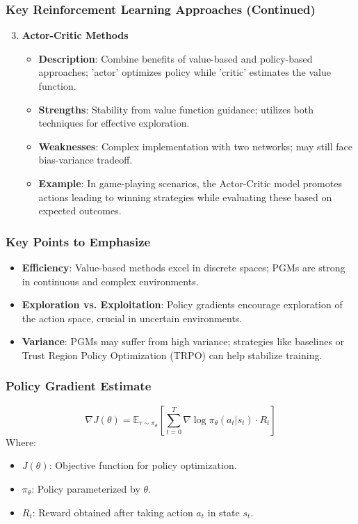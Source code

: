 \documentclass[aspectratio=169]{beamer}
\begin{document}
\begin{frame}[fragile]
    \frametitle{Key Reinforcement Learning Approaches (Continued)}
    \begin{enumerate}
        \setcounter{enumi}{2}
        \item \textbf{Actor-Critic Methods}
            \begin{itemize}
                \item \textbf{Description}: Combine benefits of value-based and policy-based approaches; 'actor' optimizes policy while 'critic' estimates the value function.
                \item \textbf{Strengths}: Stability from value function guidance; utilizes both techniques for effective exploration.
                \item \textbf{Weaknesses}: Complex implementation with two networks; may still face bias-variance tradeoff.
                \item \textbf{Example}: In game-playing scenarios, the Actor-Critic model promotes actions leading to winning strategies while evaluating these based on expected outcomes.
            \end{itemize}
    \end{enumerate}
\end{frame}

\begin{frame}[fragile]
    \frametitle{Key Points to Emphasize}
    \begin{itemize}
        \item \textbf{Efficiency}: Value-based methods excel in discrete spaces; PGMs are strong in continuous and complex environments.
        \item \textbf{Exploration vs. Exploitation}: Policy gradients encourage exploration of the action space, crucial in uncertain environments.
        \item \textbf{Variance}: PGMs may suffer from high variance; strategies like baselines or Trust Region Policy Optimization (TRPO) can help stabilize training.
    \end{itemize}
\end{frame}

\begin{frame}[fragile]
    \frametitle{Policy Gradient Estimate}
    \begin{equation}
        \nabla J(\theta) = \mathbb{E}_{\tau \sim \pi_\theta} \left[ \sum_{t=0}^{T} \nabla \log \pi_\theta(a_t | s_t) \cdot R_t \right]
    \end{equation}
    Where:
    \begin{itemize}
        \item \( J(\theta) \): Objective function for policy optimization.
        \item \( \pi_\theta \): Policy parameterized by \( \theta \).
        \item \( R_t \): Reward obtained after taking action \( a_t \) in state \( s_t \).
    \end{itemize}
\end{frame}
\end{document}
